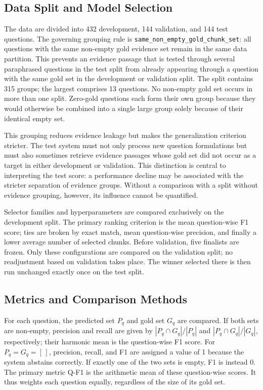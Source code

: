 \documentclass[11pt]{article}
\begin{document}
\subsection{Data Split and Model Selection}

The data are divided into 432 development, 144 validation, and 144 test questions. The governing grouping rule is \texttt{same\_non\_empty\_gold\_chunk\_set}: all questions with the same non-empty gold evidence set remain in the same data partition. This prevents an evidence passage that is tested through several paraphrased questions in the test split from already appearing through a question with the same gold set in the development or validation split. The split contains 315 groups; the largest comprises 13 questions. No non-empty gold set occurs in more than one split. Zero-gold questions each form their own group because they would otherwise be combined into a single large group solely because of their identical empty set.

This grouping reduces evidence leakage but makes the generalization criterion stricter. The test system must not only process new question formulations but must also sometimes retrieve evidence passages whose gold set did not occur as a target in either development or validation. This distinction is central to interpreting the test score: a performance decline may be associated with the stricter separation of evidence groups. Without a comparison with a split without evidence grouping, however, its influence cannot be quantified.

Selector families and hyperparameters are compared exclusively on the development split. The primary ranking criterion is the mean question-wise F1 score; ties are broken by exact match, mean question-wise precision, and finally a lower average number of selected chunks. Before validation, five finalists are frozen. Only these configurations are compared on the validation split; no readjustment based on validation takes place. The winner selected there is then run unchanged exactly once on the test split.

\subsection{Metrics and Comparison Methods}

For each question, the predicted set $P_q$ and gold set $G_q$ are compared. If both sets are non-empty, precision and recall are given by $|P_q\cap G_q|/|P_q|$ and $|P_q\cap G_q|/|G_q|$, respectively; their harmonic mean is the question-wise F1 score. For $P_q=G_q=[\,]$, precision, recall, and F1 are assigned a value of 1 because the system abstains correctly. If exactly one of the two sets is empty, F1 is instead 0. The primary metric Q-F1 is the arithmetic mean of these question-wise scores. It thus weights each question equally, regardless of the size of its gold set.
\end{document}
